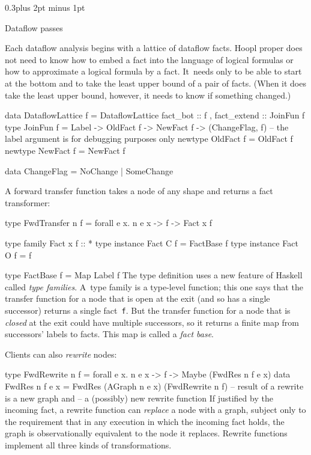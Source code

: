 \documentclass[twocolumn]{article}
\makeatletter
\newenvironment{code}{\par\unskip\kern-6pt \small\verbatim}{\endverbatim}
\newenvironment{smallcode}{\par\unskip\footnotesize\verbatim}{\endverbatim}
\newcommand\mysection[1]{%
  \par
  \vskip 0.5\baselineskip plus 2pt minus 1pt
  \noindent{\raggedright\textbf{#1}}
  \par
  \vskip 0.3\baselineskip plus 2pt minus 1pt
  \@afterindentfalse
}
\renewcommand\mysection[1]{%
  \@startsection{section}{1}{\z@}{-0.5\baselineskip plus -2pt minus -1pt}%
                                   {0.3\baselineskip plus 2pt minus 1pt}%
           {\normalfont\raggedright\bfseries}}
\makeatother
\begin{document}
\mysection*{Dataflow passes}

Each dataflow analysis begins with a lattice of dataflow facts.
Hoopl proper does not need to know how to embed a fact into the
language of logical formulas or how to approximate a logical formula
by a fact.
It~needs only to be able to start at the bottom and to take the least
upper bound of a pair of facts.
(When it does take the least upper bound, however, it needs to know if
something changed.)
\begin{smallcode}
data DataflowLattice f = DataflowLattice  
 { fact_bot        :: f
 , fact_extend     :: JoinFun f
 }
type JoinFun f
  = Label -> OldFact f -> NewFact f -> (ChangeFlag, f)
  -- the label argument is for debugging purposes only
newtype OldFact f = OldFact f
newtype NewFact f = NewFact f

data ChangeFlag = NoChange | SomeChange
\end{smallcode}

A forward transfer function takes a node of any shape and returns a
fact transformer:
\begin{code}
type FwdTransfer n f 
  = forall e x. n e x -> f -> Fact x f 

type family   Fact x f :: *
type instance Fact C f = FactBase f
type instance Fact O f = f

type FactBase f = Map Label f
\end{code}
The type definition uses a new feature of Haskell called \emph{type
  families}.
A~type family is a type-level function; this one says that the
  transfer function for a node that is open at the exit (and so has a
  single successor) returns a single fact~\texttt{f}.
But the transfer function for a node that is \emph{closed} at the exit
  could have multiple successors, so it returns a finite map from
  successors' labels to facts.
This map is called a \emph{fact base}.

Clients can also \emph{rewrite} nodes:
\begin{smallcode}
type FwdRewrite n f 
  = forall e x. n e x -> f -> Maybe (FwdRes n f e x)
data FwdRes n f e x = FwdRes (AGraph n e x) (FwdRewrite n f)
  -- result of a rewrite is a new graph and 
  -- a (possibly) new rewrite function
\end{smallcode}
If justified by the incoming fact, a rewrite function can
\emph{replace} a node with a graph, subject only to the requirement
that in any execution in which the incoming fact holds, the graph is
observationally equivalent to the node it replaces.
Rewrite functions implement all three kinds of transformations.
\end{document}
